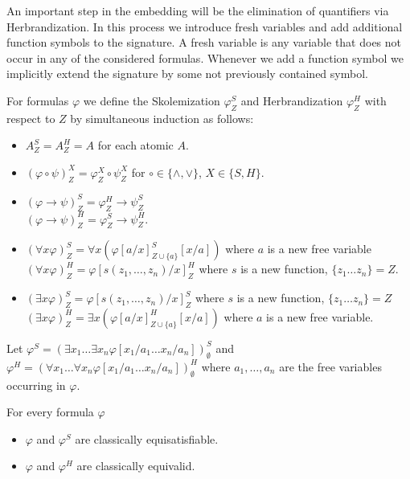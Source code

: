 \documentclass[runningheads]{llncs}
\begin{document}
An important step in the embedding will be the elimination of quantifiers via Herbrandization.
In this process we introduce fresh variables and add additional function symbols to the signature.
A fresh variable is any variable that does not occur in any of the considered formulas.
Whenever we add a function symbol we implicitly extend the signature by some not previously contained symbol.

\begin{definition}
	For formulas $\varphi$ we define the Skolemization $\varphi^S_Z$ and Herbrandization $\varphi^H_Z$ with respect to $Z$ by simultaneous induction as follows:
	\begin{itemize}
		\item $A^S_Z = A^H_Z = A$ for each atomic $A$.
		\item $(\varphi\circ\psi)^X_Z = \varphi^X_Z\circ\psi^X_Z$ for $\circ\in\{\wedge, \vee\}$, $X\in\{S, H\}$.
		\item $(\varphi\to\psi)^S_Z = \varphi^H_Z\to \psi^S_Z$\\$(\varphi\to\psi)^H_Z = \varphi^S_Z\to\psi^H_Z$.
		\item $(\forall x\varphi)^S_Z = \forall x(\varphi[a/x]^S_{Z\cup\{a\}}[x/a])$ where $a$ is a new free variable\\$(\forall x\varphi)^H_Z = \varphi[s(z_1,\dots,z_n)/x]^H_Z$ where $s$ is a new function, $\{z_1\dots z_n\} = Z$.
		\item $(\exists x\varphi)^S_Z = \varphi[s(z_1,\dots,z_n)/x]^S_Z$ where $s$ is a new function, $\{z_1\dots z_n\} = Z$\\$(\exists x\varphi)^H_Z = \exists x(\varphi[a/x]^H_{Z\cup\{a\}}[x/a])$ where $a$ is a new free variable.
	\end{itemize}
	Let $\varphi^S = (\exists x_1\dots\exists x_n \varphi[x_1/a_1\dots x_n/a_n])^S_\emptyset$ and $\varphi^H = (\forall x_1\dots\forall x_n \varphi[x_1/a_1\dots x_n/a_n])^H_\emptyset$ where $a_1,\dots,a_n$ are the free variables occurring in $\varphi$.
\end{definition}

\begin{theorem}
	\label{thm:herbrand-skolem}
	For every formula $\varphi$
	\begin{itemize}
		\item $\varphi$ and $\varphi^S$ are classically equisatisfiable.
		\item $\varphi$ and $\varphi^H$ are classically equivalid.
	\end{itemize}
\end{theorem}
\end{document}
